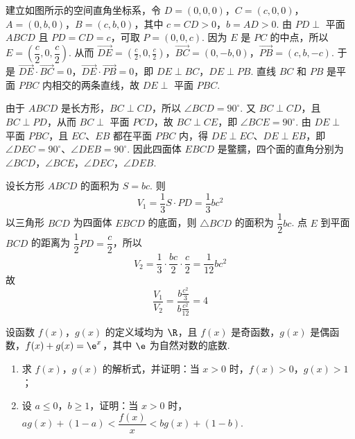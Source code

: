 \begin{solution}
建立如图所示的空间直角坐标系，令
\(D=(0,0,0)\)，\(C=(c,0,0)\)，\(A=(0,b,0)\)，\(B=(c,b,0)\)，其中 \(c=CD>0\)，\(b=AD>0\). 由 \(PD\perp\) 平面 \(ABCD\) 且 \(PD=CD=c\)，可取 \(P=(0,0,c)\). 因为 \(E\) 是 \(PC\) 的中点，所以 \(E=\left(\dfrac{c}{2},0,\dfrac{c}{2}\right)\). 从而
\(\overrightarrow{DE}=\left(\frac{c}{2},0,\frac{c}{2}\right)\)，\(\overrightarrow{BC}=(0,-b,0)\)，\(\overrightarrow{PB}=(c,b,-c)\).
于是 \(\overrightarrow{DE}\cdot\overrightarrow{BC}=0\)，\(\overrightarrow{DE}\cdot\overrightarrow{PB}=0\)，即 \(DE\perp BC\)，\(DE\perp PB\). 直线 \(BC\) 和 \(PB\) 是平面 \(PBC\) 内相交的两条直线，故 \(DE\perp\) 平面 \(PBC\).

由于 \(ABCD\) 是长方形，\(BC\perp CD\)，所以 \(\angle BCD=90^\circ\). 又 \(BC\perp CD\)，且 \(BC\perp PD\)，从而 \(BC\perp\) 平面 \(PCD\)，故 \(BC\perp CE\)，即 \(\angle BCE=90^\circ\). 由 \(DE\perp\) 平面 \(PBC\)，且 \(EC\)、\(EB\) 都在平面 \(PBC\) 内，得 \(DE\perp EC\)、\(DE\perp EB\)，即 \(\angle DEC=90^\circ\)、\(\angle DEB=90^\circ\). 因此四面体 \(EBCD\) 是鳖臑，四个面的直角分别为 \(\angle BCD\)，\(\angle BCE\)，\(\angle DEC\)，\(\angle DEB\).

设长方形 \(ABCD\) 的面积为 \(S=bc\). 则
\[
V_1=\frac{1}{3}S\cdot PD=\frac{1}{3}bc^2
\]
以三角形 \(BCD\) 为四面体 \(EBCD\) 的底面，则 \(\triangle BCD\) 的面积为 \(\dfrac{1}{2}bc\). 点 \(E\) 到平面 \(BCD\) 的距离为 \(\dfrac{1}{2}PD=\dfrac{c}{2}\)，所以
\[
V_2=\frac{1}{3}\cdot\frac{bc}{2}\cdot\frac{c}{2}=\frac{1}{12}bc^2
\]
故
\[
\frac{V_1}{V_2}=\frac{b\frac{c^2}{3}}{b\frac{c^2}{12}}=4
\]
\end{solution}

\begin{problem}
设函数 \(f(x)\)，\(g(x)\) 的定义域均为 \(\R\)，且 \(f(x)\) 是奇函数，\(g(x)\) 是偶函数，\(f(x)+g(x)=\e^x\)，其中 \(\e\) 为自然对数的底数.

\begin{enumerate}
\item 求 \(f(x)\)，\(g(x)\) 的解析式，并证明：当 \(x>0\) 时，\(f(x)>0\)，\(g(x)>1\)；
\item 设 \(a\leqslant 0\)，\(b\geqslant 1\)，证明：当 \(x>0\) 时，\(ag(x)+(1-a)<\dfrac{f(x)}{x}<bg(x)+(1-b)\).
\end{enumerate}
\end{problem}

